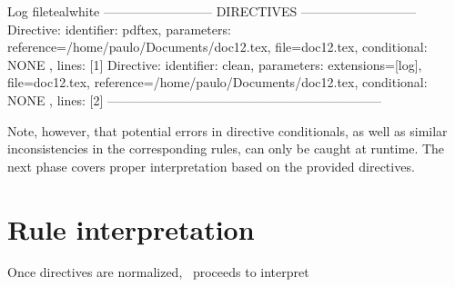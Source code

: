 \begin{codebox}{Log file}{teal}{\icnote}{white}
-------------------------- DIRECTIVES ---------------------------
Directive: { identifier: pdftex, parameters:
{reference=/home/paulo/Documents/doc12.tex,
file=doc12.tex}, conditional: { NONE }, lines: [1] }
Directive: { identifier: clean, parameters: {extensions=[log],
file=doc12.tex, reference=/home/paulo/Documents/doc12.tex},
conditional: { NONE }, lines: [2] }
-----------------------------------------------------------------
\end{codebox}

Note, however, that potential errors in directive conditionals, as well as similar inconsistencies in the corresponding rules, can only be caught at runtime. The next phase covers proper interpretation based on the provided directives.

\section{Rule interpretation}
\label{sec:ruleinterpretation}

Once directives are normalized, \arara\ proceeds to interpret 



